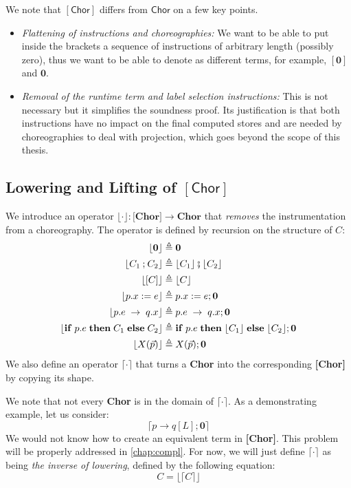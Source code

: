 \documentclass[12pt,a4paper,twoside]{book}
\begin{document}
We note that $\mathsf{[Chor]}$ differs from $\mathsf{Chor}$ on a few key points.
\begin{itemize}
	\item \emph{Flattening of instructions and choreographies:} We want to be able to put inside the brackets a sequence of instructions of arbitrary length (possibly zero), thus we want to be able to denote as different terms, for example, $[\boldsymbol{0}]$ and $\boldsymbol{0}$.
	\item \emph{Removal of the runtime term and label selection instructions:} This is not necessary but it simplifies the soundness proof. Its justification is that both instructions have no impact on the final computed stores and are needed by choreographies to deal with projection\cite{montesi2023introduction}, which goes beyond the scope of this thesis.
\end{itemize}

\subsection{Lowering and Lifting of $\mathsf{[Chor]}$}
We introduce an operator $\lfloor \cdot \rfloor: \textbf{[Chor]} \rightarrow \textbf{Chor}$ that \emph{removes} the instrumentation from a choreography. The operator is defined by recursion on the structure of $C$:
\begin{align*}
\lfloor \boldsymbol{0}\rfloor & \triangleq \boldsymbol{0} \\
\lfloor C_1 \mathbin{;} C_2\rfloor & \triangleq \lfloor C_1 \rfloor \fatsemi \lfloor C_2 \rfloor\\
\lfloor [C] \rfloor & \triangleq \lfloor C \rfloor\\
	\lfloor p.x \mathrel{:=} e \rfloor & \triangleq p.x \mathrel{:=} e; \boldsymbol{0}\\
	\lfloor p.e \;\rightarrow\; q.x \rfloor & \triangleq p.e \;\rightarrow\; q.x; \boldsymbol{0}\\
\lfloor \mathbf{if}\; p.e\; \mathbf{then}\; C_1\; \mathbf{else}\; C_2 \rfloor
	& \triangleq \mathbf{if}\; p.e\; \mathbf{then}\; \lfloor C_1\rfloor\; \mathbf{else}\; \lfloor C_2 \rfloor; \boldsymbol{0}\\
	\lfloor X(\vec{p})\rfloor & \triangleq X(\vec{p}); \boldsymbol{0}
\end{align*}
We also define an operator $\lceil \cdot \rceil$ that turns a \textbf{Chor} into the corresponding \textbf{[Chor]} by copying its shape.

We note that not every \textbf{Chor} is in the domain of $\lceil \cdot \rceil$.
As a demonstrating example, let us consider:
$$
\lceil p \rightarrow q[L]; \boldsymbol{0} \rceil
$$
We would not know how to create an equivalent term in \textbf{[Chor]}.
This problem will be properly addressed in \ref{chap:compl}. For now, we will just define $\lceil \cdot \rceil$ as being \emph{the inverse of lowering}, defined by the following equation:
\begin{equation}\label{defs:lift_chor}
C = \lfloor \lceil C \rceil \rfloor
\end{equation}
\end{document}
